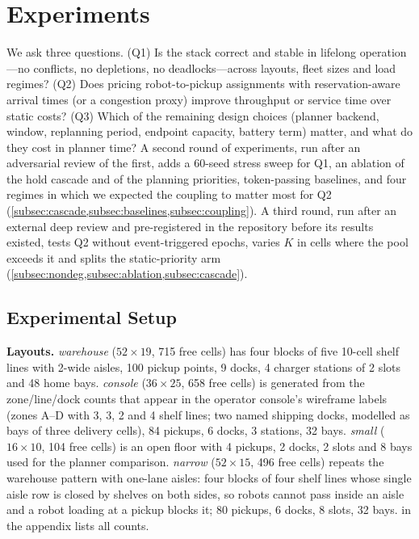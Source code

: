 \section{Experiments}\label{sec:exp}

We ask three questions. (Q1) Is the stack correct and stable in lifelong
operation---no conflicts, no depletions, no deadlocks---across layouts, fleet
sizes and load regimes? (Q2) Does pricing robot-to-pickup assignments with
reservation-aware arrival times (or a congestion proxy) improve throughput or
service time over static costs?
(Q3) Which of the remaining design choices (planner backend, window,
replanning period, endpoint capacity, battery term) matter, and what do they
cost in planner time? A second round of experiments, run after an adversarial
review of the first, adds a 60-seed stress sweep for Q1, an ablation of the
hold cascade and of the planning priorities, token-passing baselines, and
four regimes in which we expected the coupling to matter most for Q2
(\cref{subsec:cascade,subsec:baselines,subsec:coupling}). A third round, run
after an external deep review and pre-registered in the repository before its
results existed, tests Q2 without event-triggered epochs, varies $K$ in cells
where the pool exceeds it and splits the static-priority arm
(\cref{subsec:nondeg,subsec:ablation,subsec:cascade}).

\subsection{Experimental Setup}\label{subsec:setup}

\noindent\textbf{Layouts.}
\emph{warehouse} ($52\times19$, 715 free cells) has four blocks of five
10-cell shelf lines with 2-wide aisles, 100 pickup points, 9 docks, 4 charger
stations of 2 slots and 48 home bays. \emph{console} ($36\times25$, 658 free
cells) is generated from the zone/line/dock counts that appear in the
operator console's wireframe labels (zones A--D with 3, 3, 2 and 4 shelf
lines; two named shipping docks, modelled as bays of three delivery cells), 84
pickups, 6 docks, 3 stations, 32 bays. \emph{small} ($16\times10$, 104 free
cells) is an open floor with 4 pickups, 2 docks, 2 slots and 8 bays used for
the planner comparison. \emph{narrow} ($52\times15$, 496 free cells) repeats
the warehouse pattern with one-lane aisles: four blocks of four shelf lines
whose single aisle row is closed by shelves on both sides, so robots cannot
pass inside an aisle and a robot loading at a pickup blocks it; 80 pickups, 6
docks, 8 slots, 32 bays.  in the appendix lists all counts.

